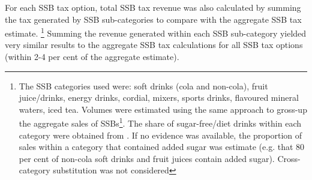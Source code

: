 \documentclass[embargoed]{grattan}
\begin{document}
For each SSB tax option, total SSB tax revenue was also calculated by summing the tax generated by SSB sub-categories to compare with the aggregate SSB tax estimate.%
\footnote{The SSB categories used were: soft drinks (cola and non-cola), fruit juice/drinks, energy drinks, cordial, mixers, sports drinks, flavoured mineral waters, iced tea.
Volumes were estimated using the same approach to gross-up the aggregate sales of SSBs\footcites{IBISWorld2016SoftDrinkManufacturing}{IBISWorld2016FruitJuiceDrink}{Media2015RetailWorldAnnual}.
The share of sugar-free/diet drinks within each category were obtained from \textcite[][Table~1]{Levy2014QuenchingAustraliasthirst}.
If no evidence was available, the proportion of sales within a category that contained added sugar was estimate (e.g. that 80 per cent of non-cola soft drinks and fruit juices contain added sugar).
Cross-category substitution was not considered} Summing the revenue generated within each SSB sub-category yielded very similar results to the aggregate SSB tax calculations for all SSB tax options (within 2-4 per cent of the aggregate estimate).

\printbibliography
\end{document}
